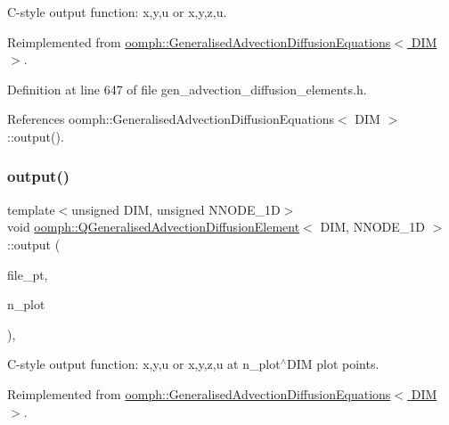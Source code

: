 C-\/style output function\+: x,y,u or x,y,z,u. 



Reimplemented from \hyperlink{classoomph_1_1GeneralisedAdvectionDiffusionEquations_a299369dd1b578aa3634623c636440dde}{oomph\+::\+Generalised\+Advection\+Diffusion\+Equations$<$ D\+I\+M $>$}.



Definition at line 647 of file gen\+\_\+advection\+\_\+diffusion\+\_\+elements.\+h.



References oomph\+::\+Generalised\+Advection\+Diffusion\+Equations$<$ D\+I\+M $>$\+::output().

\mbox{\label{classoomph_1_1QGeneralisedAdvectionDiffusionElement_a40f61af18b55e3570fec3ea7e11c7127}} 
\subsubsection{\texorpdfstring{output()}{output()}\hspace{0.1cm}{\footnotesize\ttfamily [4/4]}}
{\footnotesize\ttfamily template$<$unsigned D\+IM, unsigned N\+N\+O\+D\+E\+\_\+1D$>$ \\
void \hyperlink{classoomph_1_1QGeneralisedAdvectionDiffusionElement}{oomph\+::\+Q\+Generalised\+Advection\+Diffusion\+Element}$<$ D\+IM, N\+N\+O\+D\+E\+\_\+1D $>$\+::output (\begin{DoxyParamCaption}\item[{F\+I\+LE $\ast$}]{file\+\_\+pt,  }\item[{const unsigned \&}]{n\+\_\+plot }\end{DoxyParamCaption})\hspace{0.3cm}{\ttfamily [inline]}, {\ttfamily [virtual]}}



C-\/style output function\+: x,y,u or x,y,z,u at n\+\_\+plot$^\wedge$\+D\+IM plot points. 



Reimplemented from \hyperlink{classoomph_1_1GeneralisedAdvectionDiffusionEquations_afcc8b4ee77728a11e26f8cd512874832}{oomph\+::\+Generalised\+Advection\+Diffusion\+Equations$<$ D\+I\+M $>$}.



